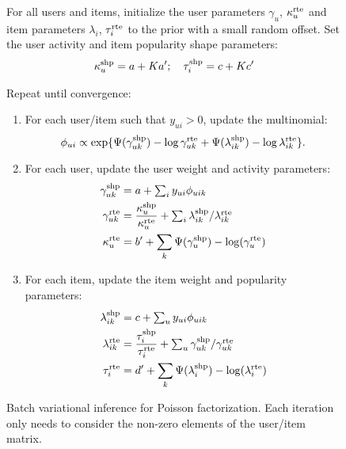 \begin{figure}
  \begin{framed}
    For all users and items, initialize the user parameters
    $\gamma_u$, $\kappa_u^{\textrm{rte}}$ and item parameters $\lambda_i$,
    $\tau_i^{\textrm{rte}}$ to the prior with a small random offset. Set the
    user activity and item popularity shape parameters:
    \begin{align}
      \kappa_u^{\textrm{shp}} = a + Ka'; \quad \tau_i^{\textrm{shp}} = c + Kc'\nonumber
    \end{align}

    \vspace{0.1in}

    Repeat until convergence:
    \begin{enumerate}
    \item For each user/item such that $y_{ui} > 0$, update the multinomial:
      \begin{equation*}
        \phi_{ui} \propto \exp\{\Psi(\gamma_{uk}^{\textrm{shp}}) - \log
        \gamma_{uk}^{\textrm{rte}} + \Psi(\lambda_{ik}^{\textrm{shp}}) - \log
        \lambda_{ik}^{\textrm{rte}}\}.
      \end{equation*}
    \item For each user, update the user weight and activity parameters:
      \begin{align}
        \gamma_{uk}^{\textrm{shp}} & = a + \textstyle \sum_{i} y_{ui}
        \phi_{uik} \nonumber\\
        \gamma_{uk}^{\textrm{rte}} & = \frac{\kappa_u^{\textrm{shp}}}{\kappa_u^{\textrm{rte}}} + \textstyle \sum_i \lambda_{ik}^{\textrm{shp}} / \lambda_{ik}^{\textrm{rte}}\nonumber\\
        \kappa_{u}^{\textrm{rte}} & = b' + \sum_k \Psi(\gamma_u^{\textrm{shp}}) - \log(\gamma_u^{\textrm{rte}})\nonumber
      \end{align}
    \item For each item, update the item weight and popularity parameters:
      \begin{align}
        \lambda_{ik}^{\textrm{shp}} & = c + \textstyle \sum_{u} y_{ui}
        \phi_{uik}\nonumber\\
        \lambda_{ik}^{\textrm{rte}} & = \frac{\tau_i^{\textrm{shp}}}{\tau_i^{\textrm{rte}}} + \textstyle \sum_u
        \gamma_{uk}^{\textrm{shp}} / \gamma_{uk}^{\textrm{rte}}\nonumber\\
        \tau_{i}^{\textrm{rte}} & = d' + \sum_k \Psi(\lambda_i^{\textrm{shp}}) -
        \log(\lambda_i^{\textrm{rte}})\nonumber
      \end{align}
    \end{enumerate}
\end{framed}
\caption{\label{fig:batch}Batch variational inference for Poisson
  factorization.  Each iteration only needs to consider the non-zero
  elements of the user/item matrix.}
\end{figure}

